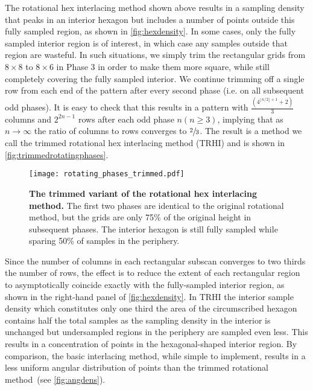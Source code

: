 \documentclass[aip, amsmath, amssymb, nobibnotes, nofootinbib, citeautoscript, reprint, superscriptaddress]{revtex4-2}
\begin{document}
    The rotational hex interlacing method shown above results in a sampling density that peaks in an interior hexagon but includes a number of points outside this fully sampled region, as shown in \autoref{fig:hexdensity}.
    In some cases, only the fully sampled interior region is of interest, in which case any samples outside that region are wasteful.
    In such situations, we simply trim the rectangular grids from $8\times 8$ to $8\times 6$ in
    Phase 3 in order to make them more square, while still completely covering the fully sampled interior.
    We continue trimming off a single row from each end of the pattern after every second phase (i.e. on all subsequent odd phases).
    It is easy to check that this results in a pattern with $\frac{\left(4^{\lfloor n/2\rfloor + 1} + 2\right)}{3}$ columns and $2^{2n - 1}$ rows after each odd phase $n\left(n\ge 3\right)$, implying that as $n\to\infty$ the
    ratio of columns to rows converges to $\sfrac{2}{3}$.
    The result is a method we call the trimmed rotational hex interlacing method (TRHI) and is shown in \autoref{fig:trimmedrotatingphases}.


    \begin{figure*}
        \texttt{[image: rotating\_phases\_trimmed.pdf]}
        \caption{
            \label{fig:trimmedrotatingphases} 
            \textbf{The trimmed variant of the rotational hex interlacing method.}
            The first two phases are identical to the original rotational method, but the grids are only 75\% of the original height in subsequent phases.
            The interior hexagon is still fully sampled while sparing 50\% of samples in the periphery.
            }
    \end{figure*}


    Since the number of columns in each rectangular subscan converges to two thirds the number of rows, the effect is to reduce the extent of each rectangular region to asymptotically coincide exactly with the fully-sampled interior region, as shown in the right-hand panel of \autoref{fig:hexdensity}.
    In TRHI the interior sample density which constitutes only one third the area of the circumscribed hexagon contains half the total samples as the sampling density in the interior is unchanged but undersampled regions in the periphery are sampled even less.
    This results in a concentration of points in the hexagonal-shaped interior region.
    By comparison, the basic interlacing method, while simple to implement, results in a less uniform angular distribution of points than the trimmed rotational method~(see \autoref{fig:angdens}).
\end{document}
